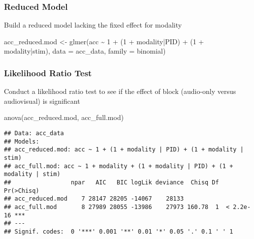 \documentclass[
]{article}
\newenvironment{Shaded}{\begin{snugshade}}{\end{snugshade}}
\newcommand{\AttributeTok}[1]{\textcolor[rgb]{0.77,0.63,0.00}{#1}}
\newcommand{\DecValTok}[1]{\textcolor[rgb]{0.00,0.00,0.81}{#1}}
\newcommand{\FunctionTok}[1]{\textcolor[rgb]{0.00,0.00,0.00}{#1}}
\newcommand{\NormalTok}[1]{#1}
\newcommand{\OtherTok}[1]{\textcolor[rgb]{0.56,0.35,0.01}{#1}}
\newcommand{\SpecialCharTok}[1]{\textcolor[rgb]{0.00,0.00,0.00}{#1}}
\begin{document}
\hypertarget{reduced-model-1}{%
\subsubsection{Reduced Model}\label{reduced-model-1}}

Build a reduced model lacking the fixed effect for modality

\begin{Shaded}
\begin{Highlighting}[]
\NormalTok{acc\_reduced.mod }\OtherTok{\textless{}{-}} \FunctionTok{glmer}\NormalTok{(acc }\SpecialCharTok{\textasciitilde{}} \DecValTok{1} \SpecialCharTok{+} 
\NormalTok{                           (}\DecValTok{1} \SpecialCharTok{+}\NormalTok{ modality}\SpecialCharTok{|}\NormalTok{PID) }\SpecialCharTok{+}\NormalTok{ (}\DecValTok{1} \SpecialCharTok{+}\NormalTok{ modality}\SpecialCharTok{|}\NormalTok{stim), }
                         \AttributeTok{data =}\NormalTok{ acc\_data, }
                         \AttributeTok{family =}\NormalTok{ binomial)}
\end{Highlighting}
\end{Shaded}

\hypertarget{likelihood-ratio-test-1}{%
\subsubsection{Likelihood Ratio Test}\label{likelihood-ratio-test-1}}

Conduct a likelihood ratio test to see if the effect of block
(audio-only versus audiovisual) is significant

\begin{Shaded}
\begin{Highlighting}[]
\FunctionTok{anova}\NormalTok{(acc\_reduced.mod, acc\_full.mod)}
\end{Highlighting}
\end{Shaded}

\begin{verbatim}
## Data: acc_data
## Models:
## acc_reduced.mod: acc ~ 1 + (1 + modality | PID) + (1 + modality | stim)
## acc_full.mod: acc ~ 1 + modality + (1 + modality | PID) + (1 + modality | stim)
##                 npar   AIC   BIC logLik deviance  Chisq Df Pr(>Chisq)    
## acc_reduced.mod    7 28147 28205 -14067    28133                         
## acc_full.mod       8 27989 28055 -13986    27973 160.78  1  < 2.2e-16 ***
## ---
## Signif. codes:  0 '***' 0.001 '**' 0.01 '*' 0.05 '.' 0.1 ' ' 1
\end{verbatim}
\end{document}
